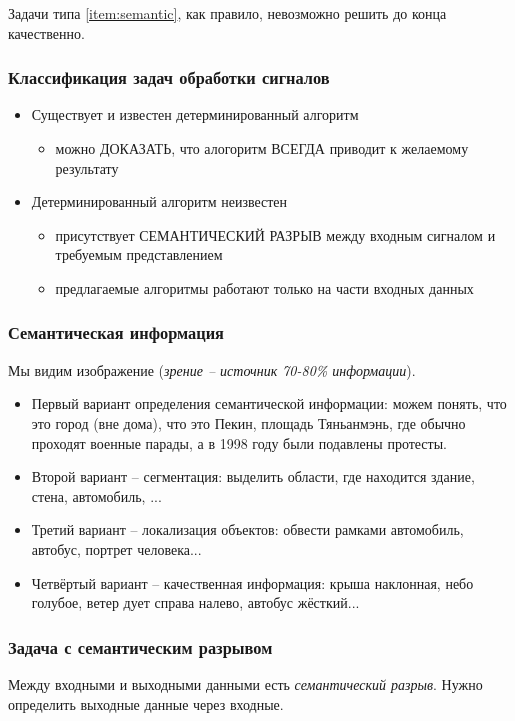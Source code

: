 \documentclass[main.tex]{subfiles}
\begin{document}
Задачи типа \ref{item:semantic}, как правило, невозможно решить до конца качественно.

\subsubsection{Классификация задач обработки сигналов}

\begin{itemize}[noitemsep]
    \item Существует и известен детерминированный алгоритм
    \begin{itemize}[noitemsep]
        \item можно ДОКАЗАТЬ, что алогоритм ВСЕГДА приводит к желаемому результату
    \end{itemize}
    \item Детерминированный алгоритм неизвестен %
    \begin{itemize}[noitemsep]
        \item присутствует СЕМАНТИЧЕСКИЙ РАЗРЫВ между входным сигналом и требуемым представлением
        \item предлагаемые алгоритмы работают только на части входных данных
    \end{itemize}
\end{itemize}

\subsubsection{Семантическая информация}
Мы видим изображение (\emph{зрение -- источник 70-80\% информации}).
\begin{itemize}[noitemsep]
    \item Первый вариант определения семантической информации: можем понять, что это город (вне дома), что это Пекин, площадь Тяньанмэнь, где обычно проходят военные парады, а в 1998 году были подавлены протесты.
    \item Второй вариант -- сегментация: выделить области, где находится здание, стена, автомобиль, ...
    \item Третий вариант -- локализация объектов: обвести рамками автомобиль, автобус, портрет человека...
    \item Четвёртый вариант -- качественная информация: крыша наклонная, небо голубое, ветер дует справа налево, автобус жёсткий...
\end{itemize}


\subsubsection{Задача с семантическим разрывом}
Между входными и выходными данными есть \emph{семантический разрыв}.
Нужно определить выходные данные через входные.
\end{document}
